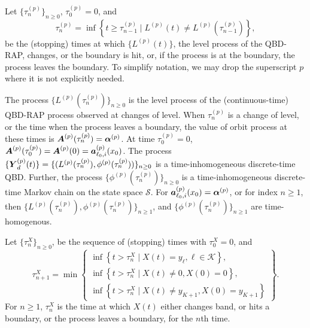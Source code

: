 Let \(\{\tau_n^{(p)}\}_{n\geq 0}\), \(\tau_0^{(p)}=0\), and
\[\tau_{n}^{(p)} = \inf\left\{t\geq \tau_{n-1}^{(p)} \mid L^{(p)}(t)\neq L^{(p)}(\tau_{n-1}^{(p)})\right\},\]
be the (stopping) times at which \(\{L^{(p)}(t)\}\), the level process of the QBD-RAP, changes, or the boundary is hit, or, if the process is at the boundary, the process leaves the boundary. To simplify notation, we may drop the superscript \(p\) where it is not explicitly needed. 

The process \(\{L^{(p)}(\tau_n^{(p)})\}_{n\geq 0}\) is the level process of the (continuous-time) QBD-RAP process observed at changes of level. When \(\tau_n^{(p)}\) is a change of level, or the time when the process leaves a boundary, the value of orbit process at these times is \(\boldsymbol A^{(p)}(\tau_n^{(p)}) = \boldsymbol \alpha^{(p)}\). At time \(\tau_0^{(p)} =0\), \(\boldsymbol A^{(p)}(\tau_0^{(p)})=\boldsymbol A^{(p)}(0) = \boldsymbol   a_{\ell_0,i}^{(p)}(x_0)\). The process \(\{\boldsymbol Y_d^{(p)}(t)\} = \{(L^{(p)}(\tau_n^{(p)}),\phi^{(p)}(\tau_n^{(p)}))\}_{n\geq 0}\) is a time-inhomogeneous discrete-time QBD. Further, the process \(\{\phi^{(p)}(\tau_n^{(p)})\}_{n\geq 0}\) is a time-inhomogeneous discrete-time Markov chain on the state space \(\mathcal S\). For \(\boldsymbol   a_{\ell_0,i}^{(p)}(x_0) = \boldsymbol \alpha^{(p)}\), or for index \(n\geq 1\), then \(\{L^{(p)}(\tau_n^{(p)}),\phi^{(p)}(\tau_n^{(p)})\}_{n\geq 1}\), and \(\{\phi^{(p)}(\tau_n^{(p)})\}_{n\geq 1}\) are time-homogenous.

Let \(\{\tau_n^X\}_{n\geq 0}\), be the sequence of (stopping) times with \(\tau_0^X=0\), and 
\[\tau_{n+1}^X = \min\left\{\begin{array}{c}\inf\left\{t>\tau_n^X\mid X(t)=y_{\ell}, \ell\in\mathcal K\right\}, \\ \inf\left\{t>\tau_n^X \mid X(t) \neq 0, X(0)=0\right\}, \\ \inf\left\{t>\tau_n^X \mid X(t) \neq y_{K+1}, X(0)=y_{K+1}\right\} \end{array} \right\}.\]
For \(n\geq 1\), \(\tau_n^X\) is the time at which \(X(t)\) either changes band, or hits a boundary, or the process leaves a boundary, for the \(n\)th time. 

